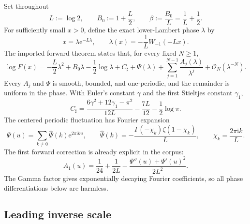 \documentclass[11pt,oneside]{article}
\numberwithin{equation}{section}
\theoremstyle{definition}
\theoremstyle{remark}
\newcommand{\e}{\mathrm e}
\newcommand{\ii}{\mathrm i}
\newcommand{\bigO}{\mathcal O}
\newcommand{\LambertW}{W}
\begin{document}
Set throughout
\begin{equation}
 L:=\log2,
 \qquad B_0:=1+\frac L2,
 \qquad \beta:=\frac{B_0}{L}=\frac1L+\frac12.
 \label{eq:constants-L-beta}
\end{equation}
For sufficiently small $x>0$, define the exact lower-Lambert phase $\lambda$
by
\begin{equation}
 x=\lambda\e^{-L\lambda},
 \qquad
 \lambda(x)=-\frac1L\LambertW_{-1}(-Lx).
 \label{eq:lambda-exact}
\end{equation}
The imported forward theorem states that, for every fixed $N\ge1$,
\begin{equation}
\boxed{
 \log F(x)=
 -\frac L2\lambda^2+B_0\lambda-\frac12\log\lambda
 +C_{\sharp}+\Psi(\lambda)
 +\sum_{j=1}^{N-1}\frac{A_j(\lambda)}{\lambda^j}
 +\bigO_N(\lambda^{-N}).}
 \label{eq:forward-all-orders}
\end{equation}
Every $A_j$ and $\Psi$ is smooth, bounded, and one-periodic, and the remainder
is uniform in the phase.  With Euler's constant $\gamma$ and the first
Stieltjes constant $\gamma_1$,
\begin{equation}
 C_{\sharp}=
 \frac{6\gamma^2+12\gamma_1-\pi^2}{12L}
 -\frac{7L}{12}-\frac12\log\pi.
 \label{eq:Csharp}
\end{equation}
The centered periodic fluctuation has Fourier expansion
\begin{equation}
 \Psi(u)=\sum_{k\ne0}\widehat\Psi(k)\e^{2\pi\ii ku},
 \qquad
 \widehat\Psi(k)=-\frac{\Gamma(-\chi_k)\zeta(1-\chi_k)}{L},
 \qquad
 \chi_k=\frac{2\pi\ii k}{L}.
 \label{eq:Psi-Fourier}
\end{equation}
The first forward correction is already explicit in the corpus:
\begin{equation}
 A_1(u)=\frac1{24}+\frac1{2L}
 -\frac{\Psi''(u)+\Psi'(u)^2}{2L^2}.
 \label{eq:A1}
\end{equation}
The Gamma factor gives exponentially decaying Fourier coefficients, so all
phase differentiations below are harmless.

\subsection{Leading inverse scale}
\end{document}
